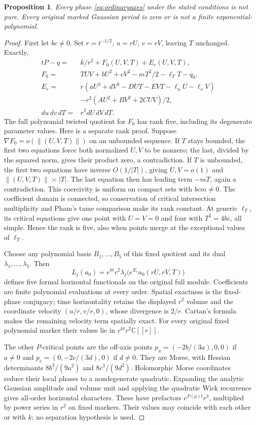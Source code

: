 \documentclass[11pt]{article}
\newtheorem{proposition}[theorem]{Proposition}
\theoremstyle{definition}\newtheorem{definition}[theorem]{Definition}
\theoremstyle{remark}\newtheorem{remark}[theorem]{Remark}
\newcommand{\C}{\mathbb C}
\begin{document}
\begin{proposition}\label{prop:axisexclusion}
Every phase \eqref{eq:ordinaryaxes} under the stated conditions
is not pure. Every original marked Gaussian period is zero or
is not a finite exponential-polynomial.
\end{proposition}
\begin{proof}
First let $bc\ne0$. Set $r=t^{-1/2}$, $u=rU$, $v=rV$, leaving
$T$ unchanged. Exactly,
\begin{align*}
 tP-q={}&k/r^2+F_0(U,V,T)+E_r(U,V,T),\\
 F_0={}&TUV+bU^2+cV^2-mT^2/2-\ell_TT-q_0,\\
 E_r={}&r(aU^3+dV^3-DUT-EVT-\ell_uU-\ell_vV)\\
       &-r^2(AU^2+BV^2+2CUV)/2,\\
 du\,dv\,dT={}&r^2dU\,dV\,dT.
\end{align*}
The full polynomial twisted quotient for $F_0$ has rank five,
including its degenerate parameter values. Here is a separate rank
proof. Suppose $\nabla F_0=o(\|(U,V,T)\|)$ on an unbounded
sequence. If $T$ stays bounded, the first two equations force
both normalized $U,V$ to be nonzero; the last, divided by the
squared norm, gives their product zero, a contradiction. If
$T$ is unbounded, the first two equations have inverse
$O(1/|T|)$, giving $U,V=o(1)$ and $\|(U,V,T)\|\asymp|T|$.
The last equation then has leading term $-mT$, again a
contradiction. This coercivity is uniform on compact sets with
$bcm\ne0$. The coefficient domain is connected, so conservation
of critical intersection multiplicity and Pham's tame comparison
make its rank constant. At generic $\ell_T$, its critical
equations give one point with $U=V=0$ and four with
$T^2=4bc$, all simple. Hence the rank is five, also when points
merge at the exceptional values of $\ell_T$.

Choose any polynomial basis $B_1,\ldots,B_5$ of this fixed
quotient and its dual $\lambda_1,\ldots,\lambda_5$. Then
\[
 L_j(a_0)=e^{kt}r^2\lambda_j\bigl(e^{E_r}a_0(rU,rV,T)\bigr)
\]
defines five formal horizontal functionals on the original full
module. Coefficients are finite polynomial evaluations at every
order. Spatial exactness is the fixed-phase conjugacy; time
horizontality retains the displayed $r^2$ volume and the
coordinate velocity $(u/r,v/r,0)$, whose divergence is $2/r$.
Cartan's formula makes the remaining velocity term spatially exact.
For every original fixed polynomial marker their values lie in
$e^{kt}r^2\C[[r]]$.

The other $P$-critical points are the off-axis points
$p_u=(-2b/(3a),0,0)$ if $a\ne0$ and
$p_v=(0,-2c/(3d),0)$ if $d\ne0$. They are Morse, with Hessian
determinants $8b^3/(9a^2)$ and $8c^3/(9d^2)$. Holomorphic Morse coordinates reduce their local phases to a
nondegenerate quadratic. Expanding the analytic Gaussian amplitude
and volume unit and applying the quadratic Wick recurrence gives
all-order horizontal characters. These have prefactors $e^{P(p)t}r^3$, multiplied by power series in
$r^2$ on fixed markers. Their values may coincide with each
other or with $k$; no separation hypothesis is used.


\end{proof}
\end{document}
